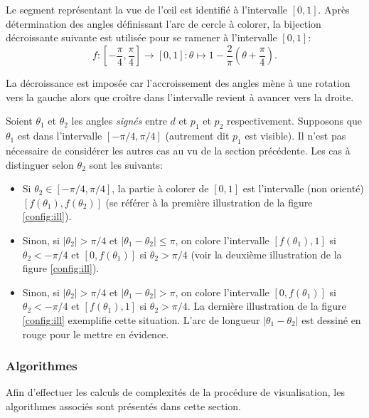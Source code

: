 Le segment représentant la vue de l'\oe{}il est identifié à l'intervalle
$[0, 1]$. Après détermination des angles définissant l'arc de cercle
à colorer, la bijection décroissante suivante est utilisée pour
se ramener à l'intervalle $[0, 1]$:
$$f:\left[-\frac{\pi}{4}, \frac{\pi}{4}\right]\to [0, 1]: \theta \mapsto 1 - \frac{2}{\pi}\left(\theta + \frac{\pi}{4}\right).$$

La décroissance est imposée car l'accroissement des angles mène
à une rotation vers la gauche alors que croître dans l'intervalle
revient à avancer vers la droite.

Soient $\theta_1$ et $\theta_2$ les angles \emph{signés}
entre $d$ et $p_1$ et $p_2$
respectivement. Supposons que $\theta_1$ est dans l'intervalle $[-\pi/4, \pi/4]$
(autrement dit $p_1$ est visible). Il n'est pas nécessaire de considérer
les autres cas au vu de la section précédente. Les cas à distinguer selon
$\theta_2$ sont les suivants:

\begin{itemize}
  \item Si $\theta_2\in[-\pi/4, \pi/4]$, la partie à colorer de $[0, 1]$ est
    l'intervalle (non orienté) $[f(\theta_1), f(\theta_2)]$
    (se référer à la première illustration de la figure \ref{config:ill}).
  \item Sinon, si $|\theta_2|>\pi/4$ et $|\theta_1-\theta_2|\leq \pi$,
    on colore l'intervalle $[f(\theta_1), 1]$ si $\theta_2<-\pi/4$ et
    $[0, f(\theta_1)]$ si $\theta_2>\pi/4$
    (voir la deuxième illustration de la figure \ref{config:ill}).
  \item Sinon, si $|\theta_2|>\pi/4$ et $|\theta_1-\theta_2|> \pi$,
    on colore l'intervalle $[0, f(\theta_1)]$ si $\theta_2<-\pi/4$ et
    $[f(\theta_1), 1]$ si $\theta_2>\pi/4$. La dernière illustration
    de la figure \ref{config:ill} exemplifie cette situation. L'arc
    de longueur $|\theta_1-\theta_2|$ est dessiné en rouge
    pour le mettre en évidence.
\end{itemize}

\subsubsection{Algorithmes}

Afin d'effectuer les calculs de complexités de la procédure
de visualisation, les algorithmes associés sont présentés
dans cette section.

